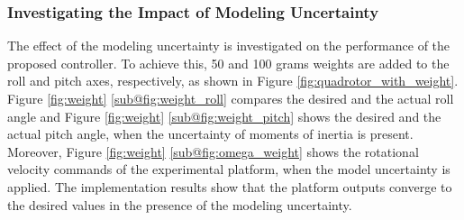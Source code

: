 \documentclass[peerreview]{IEEEtran}
\begin{document}
\subsubsection{Investigating the Impact of Modeling Uncertainty}\label{sec:model-uncertainty}
\noindent The effect of the modeling uncertainty is investigated on the performance of the proposed controller.
To achieve this, 50 and 100 grams weights are added to the roll and pitch axes, respectively, as shown in Figure \ref{fig:quadrotor_with_weight}.
Figure \ref{fig:weight} \ref{sub@fig:weight_roll} compares the desired and the actual roll angle and Figure \ref{fig:weight} \ref{sub@fig:weight_pitch} shows the desired and the actual pitch angle, when the uncertainty of moments of inertia is present.
Moreover, Figure \ref{fig:weight} \ref{sub@fig:omega_weight} shows the rotational velocity commands of the experimental platform, when the model uncertainty is applied.
The implementation results show that the platform outputs converge to the desired values in the presence of the modeling uncertainty.
\end{document}
